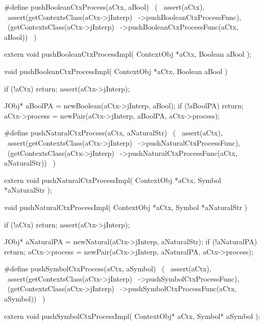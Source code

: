 \startCHeader
#define pushBooleanCtxProcess(aCtx, aBool)      \
  (                                             \
    assert(aCtx),                               \
    assert(getContextsClass(aCtx->jInterp)      \
      ->pushBooleanCtxProcessFunc),             \
    (getContextsClass(aCtx->jInterp)            \
      ->pushBooleanCtxProcessFunc(aCtx, aBool)) \
  )
\stopCHeader

\setCHeaderStream{private}
\startCHeader
extern void pushBooleanCtxProcessImpl(
  ContextObj *aCtx,
  Boolean     aBool
);
\stopCHeader
\setCHeaderStream{public}

\startCCode
void pushBooleanCtxProcessImpl(
  ContextObj *aCtx,
  Boolean     aBool
) {
  if (!aCtx) return;
  assert(aCtx->jInterp);

  JObj* aBoolPA = newBoolean(aCtx->jInterp, aBool);
  if (!aBoolPA) return;
  aCtx->process = newPair(aCtx->jInterp, aBoolPA, aCtx->process);
}
\stopCCode

\startCHeader
#define pushNaturalCtxProcess(aCtx, aNaturalStr)      \
  (                                                   \
    assert(aCtx),                                     \
    assert(getContextsClass(aCtx->jInterp)            \
      ->pushNaturalCtxProcessFunc),                   \
    (getContextsClass(aCtx->jInterp)                  \
      ->pushNaturalCtxProcessFunc(aCtx, aNaturalStr)) \
  )
\stopCHeader

\startCHeader
extern void pushNaturalCtxProcessImpl(
  ContextObj *aCtx,
  Symbol     *aNaturalStr
);
\stopCHeader
\setCHeaderStream{public}

\startCCode
void pushNaturalCtxProcessImpl(
  ContextObj *aCtx,
  Symbol     *aNaturalStr
) {
  if (!aCtx) return;
  assert(aCtx->jInterp);

  JObj* aNaturalPA = newNatural(aCtx->jInterp, aNaturalStr);
  if (!aNaturalPA) return;
  aCtx->process = newPair(aCtx->jInterp, aNaturalPA, aCtx->process);
}
\stopCCode

\startCHeader
#define pushSymbolCtxProcess(aCtx, aSymbol)      \
  (                                              \
    assert(aCtx),                                \
    assert(getContextsClass(aCtx->jInterp)       \
      ->pushSymbolCtxProcessFunc),               \
    (getContextsClass(aCtx->jInterp)             \
      ->pushSymbolCtxProcessFunc(aCtx, aSymbol)) \
  )
\stopCHeader

\startCHeader
extern void pushSymbolCtxProcessImpl(
  ContextObj* aCtx,
  Symbol* aSymbol
);
\stopCHeader
{}


